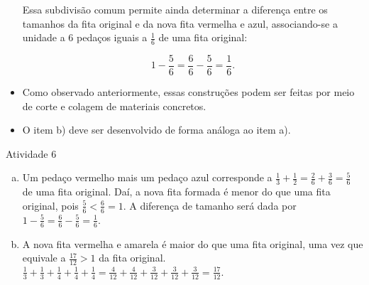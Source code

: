 \begin{multicols}{2}
\begin{itemize}
\begin{center}
\end{center}


Essa subdivisão comum permite ainda determinar a diferença entre os tamanhos da fita original e da nova fita vermelha e azul, associando-se a unidade a 6 pedaços iguais a $\frac{1}{6}$ de uma fita original:

$$ 1 - \dfrac{5}{6}=\dfrac{6}{6} - \dfrac{5}{6} = \dfrac{1}{6}.$$

\begin{center}
\end{center}
  \item Como observado anteriormente, essas construções podem ser feitas por meio de corte e colagem de materiais concretos.
  \item O item b) deve ser desenvolvido de forma análoga ao item a).
\end{itemize} %

\begin{resposta*}{Atividade 6}
\begin{enumerate}[a)]
   \item Um pedaço vermelho mais um pedaço azul corresponde a $\frac{1}{3} + \frac{1}{2} = \frac{2}{6}+ \frac{3}{6} = \frac{5}{6}$ de uma fita original. Daí, a nova fita formada é menor do que uma fita original, pois $\frac{5}{6}<\frac{6}{6}=1$. A diferença de tamanho será dada por $1- \frac{5}{6} = \frac{6}{6} - \frac{5}{6} = \frac{1}{6}$.
   \item A nova fita vermelha e amarela é maior do que uma fita original, uma vez que equivale a $\frac{17}{12}>1$ da fita original.
$\frac{1}{3}+\frac{1}{3}+\frac{1}{4}+\frac{1}{4}+\frac{1}{4} = \frac{4}{12}+\frac{4}{12}+\frac{3}{12}+\frac{3}{12}+\frac{3}{12} = \frac{17}{12}$.
  \end{enumerate}
\end{resposta*}


\end{multicols}
